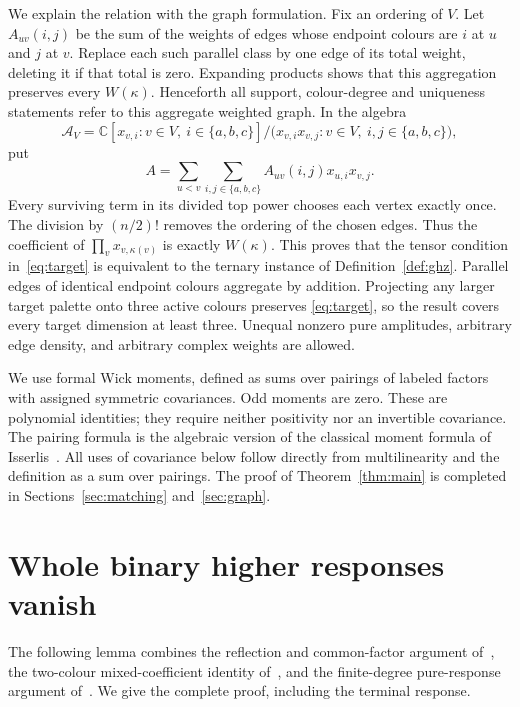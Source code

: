 \documentclass[11pt]{article}
\theoremstyle{definition}
\theoremstyle{plain}
\numberwithin{equation}{section}
\begin{document}
We explain the relation with the graph formulation. Fix an ordering of \(V\).
Let \(A_{uv}(i,j)\) be the sum of the weights of edges whose endpoint colours
are \(i\) at \(u\) and \(j\) at \(v\). Replace each such parallel class by
one edge of its total weight, deleting it if that total is zero. Expanding
products shows that this aggregation preserves every \(W(\kappa)\).
Henceforth all support, colour-degree and uniqueness statements refer to
this aggregate weighted graph. In the algebra
\[
 \mathcal A_V=\mathbb C[x_{v,i}:v\in V,\ i\in\{a,b,c\}]
       \big/\bigl(x_{v,i}x_{v,j}:v\in V,\ i,j\in\{a,b,c\}\bigr),
\]
put
\[
 A=\sum_{u<v}\sum_{i,j\in\{a,b,c\}}A_{uv}(i,j)x_{u,i}x_{v,j}.
\]
Every surviving term in its divided top power chooses each vertex exactly once.
The division by \((n/2)!\) removes the ordering of the chosen edges. Thus the
coefficient of \(\prod_v x_{v,\kappa(v)}\) is exactly \(W(\kappa)\).
This proves that the tensor condition in~\eqref{eq:target} is equivalent to
the ternary instance of Definition~\ref{def:ghz}.
Parallel edges of identical endpoint colours aggregate by addition. Projecting
any larger target palette onto three active colours preserves \eqref{eq:target},
so the result covers every target dimension at least three. Unequal nonzero pure
amplitudes, arbitrary edge density, and arbitrary complex weights are allowed.

We use formal Wick moments, defined as sums over pairings of labeled factors
with assigned symmetric covariances. Odd moments are zero. These are polynomial
identities; they require neither positivity nor an invertible covariance.
The pairing formula is the algebraic version of the classical moment formula
of Isserlis~\cite{isserlis}. All uses of covariance below follow directly
from multilinearity and the definition as a sum over pairings.
The proof of Theorem~\ref{thm:main} is completed in Sections~\ref{sec:matching}
and~\ref{sec:graph}.

\section{Whole binary higher responses vanish}\label{sec:higher}

The following lemma combines the reflection and common-factor argument
of~\cite{factors}, the two-colour mixed-coefficient identity of~\cite{mixed},
and the finite-degree pure-response argument of~\cite{pure}. We give the
complete proof, including the terminal response.
\end{document}
